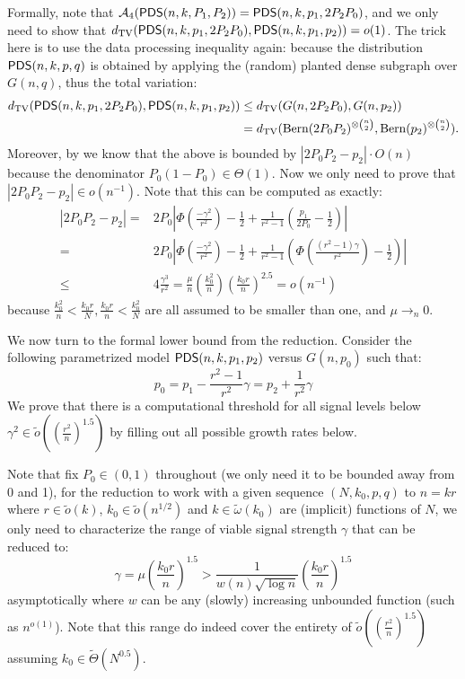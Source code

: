 \documentclass[final,12pt]{colt2023} %
\newcommand\1[1]{\mathbb{I}_{\left\{#1\right\}}}
\begin{document}
\spac Formally, note that $\mathcal{A}_4(\mathsf{PDS}(n, k, P_1, P_2))=\mathsf{PDS}(n, k, p_1, 2P_2P_0)$, and we only need to show that $d_{\rm TV}(\mathsf{PDS}(n, k, p_1, 2P_2P_0),\mathsf{PDS}(n, k, p_1, p_2))=o(1)$. The trick here is to use the data processing inequality again: because the distribution $\mathsf{PDS}(n, k, p, q)$ is obtained by applying the (random) planted dense subgraph over $G(n, q)$, thus the total variation:
\begin{align*}
    d_{\rm TV}(\mathsf{PDS}(n, k, p_1, 2P_2P_0),\mathsf{PDS}(n, k, p_1, p_2))&\leq d_{\rm TV}(G(n, 2P_2P_0), G(n, p_2))\\
    &=d_{\rm TV}({\rm Bern}(2P_0P_2)^{\otimes {n\choose 2}}, {\rm Bern}(p_2)^{\otimes {n\choose 2}}).
\end{align*}
Moreover, by  we know that the above is bounded by $|2P_0P_2-p_2|\cdot O(n)$ because the denominator $P_0(1-P_0)\in \Theta(1)$. Now we only need to prove that $|2P_0P_2-p_2|\in o(n^{-1})$. Note that this can be computed as exactly:
\begin{align*}
    |2P_0P_2-p_2|=&2P_0\left|\Phi(\frac{-\gamma^2}{r^2})-\frac{1}{2}+\frac{1}{r^2-1}\left(\frac{p_1}{2P_0}-\frac{1}{2}\right)\right|\\
    =&2P_0\left|\Phi(\frac{-\gamma^2}{r^2})-\frac{1}{2}+\frac{1}{r^2-1}(\Phi(\frac{(r^2-1)\gamma}{r^2})-\frac{1}{2})\right|\\
    \leq& 4\frac{\gamma^3}{r^2}=\frac{\mu}{n}\left(\frac{k_0^2}{n}\right)\left(\frac{k_0r}{n}\right)^{2.5}=o(n^{-1})
\end{align*}because $\frac{k_0^2}{n}<\frac{k_0r}{N}, \frac{k_0r}{n}<\frac{k_0^2}{N}$ are all assumed to be smaller than one, and $\mu\to_n 0$.

\spac We now turn to the formal lower bound from the reduction. Consider the following parametrized model $\mathsf{PDS}(n, k, p_1, p_2)$ versus $G(n, p_0)$ such that:
$$p_0=p_1-\frac{r^2-1}{r^2}\gamma=p_2+\frac{1}{r^2}\gamma$$
We prove that there is a computational threshold for all signal levels below $\gamma^2\in\tilde o((\frac{r^{2}}{n})^{1.5})$ by filling out all possible growth rates below.

\spac Note that fix $P_0\in(0,1)$ throughout (we only need it to be bounded away from 0 and 1), for the reduction to work with a given sequence $(N, k_0, p, q)$ to $n=kr$ where $r\in\tilde o(k)$, $k_0\in\tilde o(n^{1/2})$ and $k\in\tilde \omega(k_0)$ are (implicit) functions of $N$, we only need to characterize the range of viable signal strength $\gamma$ that can be reduced to:
$$\gamma=\mu(\frac{k_0r}{n})^{1.5}>\frac{1}{w(n)\sqrt{\log n}}(\frac{k_0r}{n})^{1.5}$$ asymptotically where $w$ can be any (slowly) increasing unbounded function (such as $n^{o(1)}$). Note that this range do indeed cover the entirety of $\tilde o((\frac{r^{2}}{n})^{1.5})$ assuming $k_0\in \tilde\Theta(N^{0.5})$.
\end{document}

